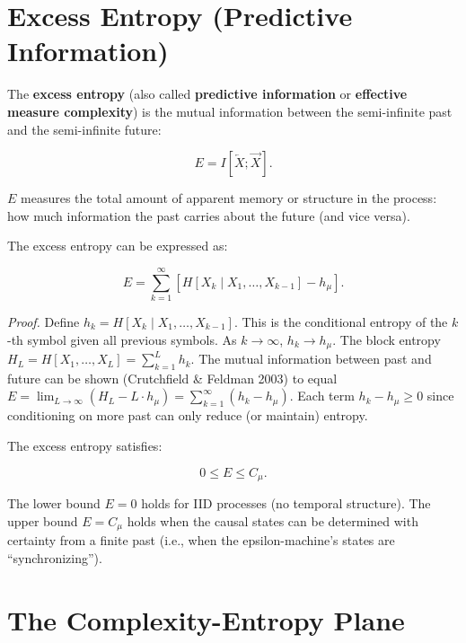 \section{Excess Entropy (Predictive Information)}

\begin{definition}
The \textbf{excess entropy} (also called \textbf{predictive information} or \textbf{effective measure complexity}) is the mutual information between the semi-infinite past and the semi-infinite future:

\[E = I[\overleftarrow{X}; \overrightarrow{X}].\]

$E$ measures the total amount of apparent memory or structure in the process: how much information the past carries about the future (and vice versa).
\end{definition}

\begin{proposition}
The excess entropy can be expressed as:

\[E = \sum_{k=1}^{\infty} \left[ H[X_k \mid X_1, \ldots, X_{k-1}] - h_\mu \right].\]


\end{proposition}

\textit{Proof.} Define $h_k = H[X_k \mid X_1, \ldots, X_{k-1}]$. This is the conditional entropy of the $k$-th symbol given all previous symbols. As $k \to \infty$, $h_k \to h_\mu$. The block entropy $H_L = H[X_1, \ldots, X_L] = \sum_{k=1}^{L} h_k$. The mutual information between past and future can be shown (Crutchfield \& Feldman 2003) to equal $E = \lim_{L \to \infty} (H_L - L \cdot h_\mu) = \sum_{k=1}^{\infty} (h_k - h_\mu)$. Each term $h_k - h_\mu \geq 0$ since conditioning on more past can only reduce (or maintain) entropy.

\begin{proposition}[Bounds]
The excess entropy satisfies:

\[0 \leq E \leq C_\mu.\]

The lower bound $E = 0$ holds for IID processes (no temporal structure). The upper bound $E = C_\mu$ holds when the causal states can be determined with certainty from a finite past (i.e., when the epsilon-machine's states are ``synchronizing'').
\end{proposition}

\section{The Complexity-Entropy Plane}

